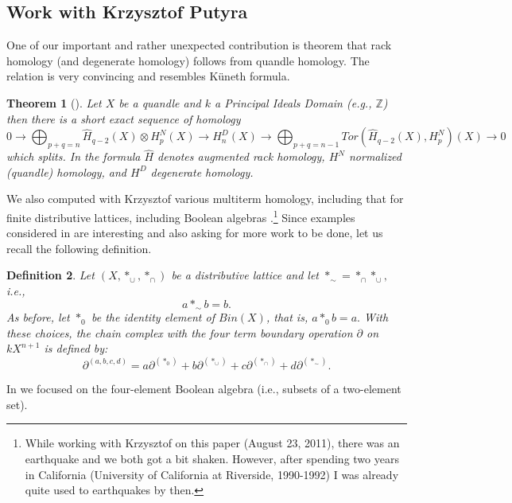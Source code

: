 \documentclass[12pt]{amsart}
\newtheorem{theorem}{Theorem}[section]
\newtheorem{definition}[theorem]{Definition}
\begin{document}
\subsection{Work with Krzysztof Putyra}\label{Putyra}
One of our important and rather unexpected contribution is theorem
that rack homology (and degenerate homology) follows from quandle homology. The relation is very convincing and resembles K\"uneth formula.
\begin{theorem}[\cite{PrPu2}] Let $X$ be a quandle and $k$ a Principal Ideals Domain (e.g., $\mathbb{Z}$) then there is a short exact sequence of homology
\begin{equation*}
0 \to \bigoplus_{p+q=n}\hat H_{q-2}(X) \otimes H^N_p(X) \to H^D_n(X) \to \bigoplus_{p+q=n-1}Tor(\hat H_{q-2}(X), H^N_p)(X)\to 0    
\end{equation*}
which splits. In the formula $\hat{H}$ denotes augmented rack homology, $H^N$ normalized (quandle) homology, and $H^D$ degenerate homology.
\end{theorem}

We also computed with Krzysztof various multiterm homology, including that for finite distributive lattices, including Boolean algebras \cite{PrPu1}.\footnote{While working with Krzysztof on this paper (August 23, 2011), there was an earthquake and we both got a bit shaken. However, after spending two years in California (University of California at Riverside, 1990-1992) I was already quite used to earthquakes by then.}  Since examples considered in \cite{PrPu1} are interesting and also
asking for more work to be done, let us recall the following definition.

\begin{definition}\label{Lattice} Let $(X,\ast _{\cup },\ast _{\cap })$ be a distributive lattice and let $\ast _{\sim }=\ast _{\cap }\ast _{\cup },$
i.e., 
\begin{equation*}
a\ast _{\sim }b=b.
\end{equation*}%
As before, let $\ast _{0}$ be the identity element of $Bin(X)$, that is, $a\ast
_{0}b=a.$ With these choices, the chain complex with the four term boundary
operation $\partial $ on $kX^{n+1}$ is defined by: 
\begin{equation*}
\partial^{(a,b,c,d)}=a\partial ^{(\ast _{0})}+b\partial ^{(\ast _{\cup
})}+c\partial ^{(\ast _{\cap })}+d\partial^{(\ast _{\sim })}.
\end{equation*}
\end{definition}
In \cite{PrPu2} we focused on the four-element Boolean algebra (i.e.,
subsets of a two-element set).
\end{document}
